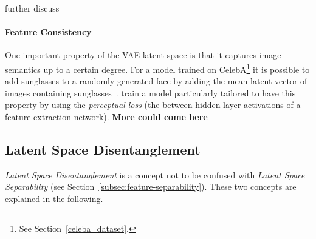 \citet{tschannen2018recent} further discuss 

\paragraph{Feature Consistency}

One important property of the \ac{VAE} latent space is that it captures image semantics up to a certain degree.
For a model trained on CelebA\footnote{See Section~\ref{celeba_dataset}.} it is possible to add sunglasses to a randomly generated face by adding the mean latent vector of images containing sunglasses~\citep{hou2017deep}.
\citet{hou2017deep} train a model particularly tailored to have this property by using the \textit{perceptual loss} (the between hidden layer activations of a feature extraction network).
\textbf{More could come here}

\subsection{Latent Space Disentanglement}\label{subsec:feature-disentanglement}
\textit{Latent Space Disentanglement} is a concept not to be confused with \textit{Latent Space Separability} (see Section~\ref{subsec:feature-separability}).
These two concepts are explained in the following.

